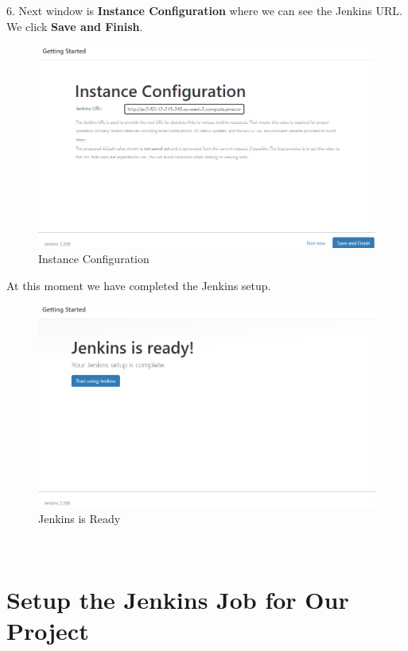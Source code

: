 \documentclass[12pt,a4paper,twoside]{article}
\begin{document}
6. Next window is \textbf{Instance Configuration} where we can see the Jenkins URL. We click \textbf{Save and Finish}.


\begin{figure}[H]
    \centering
        \includegraphics[width=15cm]{images-aws/25-jenkins-conf.png}
        \caption{Instance Configuration}
\end{figure}


At this moment we have completed the Jenkins setup.


\begin{figure}[H]
    \centering
        \includegraphics[width=15cm]{images-aws/26-jenkins-ready.png}
        \caption{Jenkins is Ready}
\end{figure}


~\newpage


\section{Setup the Jenkins Job for Our Project}
\end{document}
